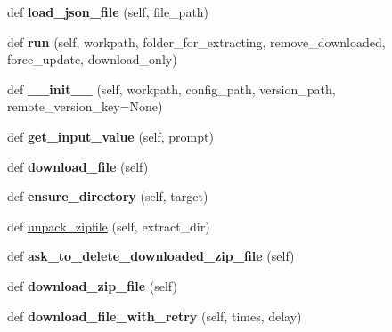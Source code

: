 \begin{DoxyCompactItemize}
def {\bfseries load\+\_\+json\+\_\+file} (self, file\+\_\+path)
\item 
\mbox{\label{classdownload-deps_1_1CocosZipInstaller_ab1c41b592e5ab5b4add271e71a29cb0d}} 
def {\bfseries run} (self, workpath, folder\+\_\+for\+\_\+extracting, remove\+\_\+downloaded, force\+\_\+update, download\+\_\+only)
\item 
\mbox{\label{classdownload-deps_1_1CocosZipInstaller_af38fbad39d223d4ceb9e137a9fb2997b}} 
def {\bfseries \+\_\+\+\_\+init\+\_\+\+\_\+} (self, workpath, config\+\_\+path, version\+\_\+path, remote\+\_\+version\+\_\+key=None)
\item 
\mbox{\label{classdownload-deps_1_1CocosZipInstaller_a76346ec90b31eb239f733609d22c47eb}} 
def {\bfseries get\+\_\+input\+\_\+value} (self, prompt)
\item 
\mbox{\label{classdownload-deps_1_1CocosZipInstaller_a539dd9a014086e1eec02d3362b7f0683}} 
def {\bfseries download\+\_\+file} (self)
\item 
\mbox{\label{classdownload-deps_1_1CocosZipInstaller_ab201b9f5025ad593224e5bf2e775ab0e}} 
def {\bfseries ensure\+\_\+directory} (self, target)
\item 
def \hyperlink{classdownload-deps_1_1CocosZipInstaller_a93043957b5e9244249c31fd67636d3e6}{unpack\+\_\+zipfile} (self, extract\+\_\+dir)
\item 
\mbox{\label{classdownload-deps_1_1CocosZipInstaller_a3ba6607775d48adc18f14bf49063c466}} 
def {\bfseries ask\+\_\+to\+\_\+delete\+\_\+downloaded\+\_\+zip\+\_\+file} (self)
\item 
\mbox{\label{classdownload-deps_1_1CocosZipInstaller_a2a8254015676ccd8b3fb7b31d27e4a23}} 
def {\bfseries download\+\_\+zip\+\_\+file} (self)
\item 
\mbox{\label{classdownload-deps_1_1CocosZipInstaller_aa97f19584f7c9ceda0e83094c9b4e966}} 
def {\bfseries download\+\_\+file\+\_\+with\+\_\+retry} (self, times, delay)

\end{DoxyCompactItemize}
